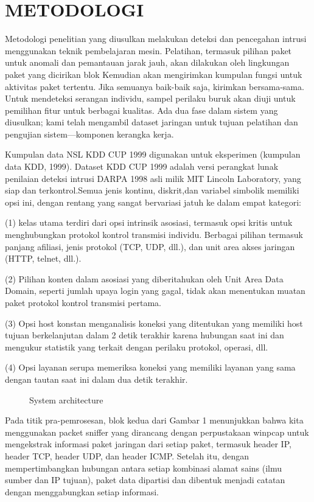\documentclass[conference]{IEEEtran}
\begin{document}
\section{METODOLOGI}
Metodologi penelitian yang diusulkan melakukan deteksi dan pencegahan intrusi menggunakan teknik pembelajaran mesin. Pelatihan, termasuk pilihan paket untuk anomali dan pemantauan jarak jauh, akan dilakukan oleh lingkungan paket yang dicirikan blok Kemudian akan mengirimkan kumpulan fungsi untuk aktivitas paket tertentu. Jika semuanya baik-baik saja, kirimkan bersama-sama. Untuk mendeteksi serangan individu, sampel perilaku buruk akan diuji untuk pemilihan fitur untuk berbagai
kualitas. Ada dua fase dalam sistem yang diusulkan; kami telah mengambil dataset jaringan untuk tujuan pelatihan dan pengujian sistem—komponen kerangka kerja.

Kumpulan data NSL KDD CUP 1999 digunakan untuk eksperimen (kumpulan data KDD, 1999). Dataset KDD CUP 1999 adalah versi perangkat lunak penilaian deteksi intrusi DARPA 1998 asli milik MIT Lincoln Laboratory, yang siap dan terkontrol.Semua jenis kontinu, diskrit,dan variabel simbolik memiliki opsi ini, dengan rentang yang sangat bervariasi jatuh ke dalam empat kategori:

(1) kelas utama terdiri dari opsi intrinsik asosiasi, termasuk opsi kritis untuk menghubungkan protokol kontrol transmisi individu. Berbagai pilihan termasuk panjang afiliasi, jenis protokol (TCP, UDP, dll.), dan unit area akses jaringan (HTTP, telnet, dll.).

(2) Pilihan konten dalam asosiasi yang diberitahukan oleh Unit Area Data Domain, seperti jumlah upaya login yang gagal, tidak akan menentukan muatan paket protokol kontrol transmisi pertama. 

(3) Opsi host konstan menganalisis koneksi yang ditentukan yang memiliki host tujuan berkelanjutan dalam 2 detik terakhir karena hubungan saat ini dan mengukur statistik yang terkait dengan perilaku protokol, operasi, dll.

(4) Opsi layanan serupa memeriksa koneksi yang memiliki layanan yang sama dengan tautan saat ini dalam dua detik terakhir.

\begin{figure}
\centering
\scalebox{0.65}{}
\caption{System architecture}
\end{figure}

Pada titik pra-pemrosesan, blok kedua dari Gambar 1 menunjukkan bahwa kita menggunakan packet sniffer yang dirancang dengan perpustakaan winpcap untuk mengekstrak informasi paket jaringan dari setiap paket, termasuk header IP, header TCP, header UDP, dan header ICMP. Setelah itu, dengan mempertimbangkan hubungan antara setiap kombinasi alamat sains (ilmu sumber dan IP tujuan), paket data dipartisi dan dibentuk menjadi catatan dengan menggabungkan setiap informasi.
\end{document}
